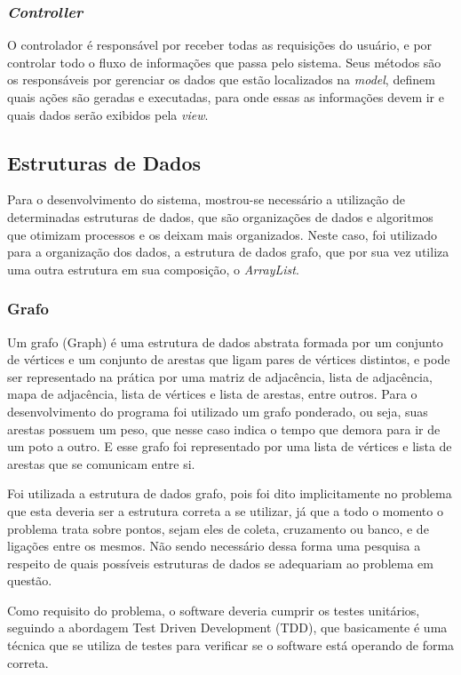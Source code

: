 \documentclass[12pt]{article}
\begin{document}
\subsubsection{\itshape{Controller}}
O controlador é responsável por receber todas as requisições do usuário, e por controlar todo o fluxo de informações que passa pelo sistema. Seus métodos são os responsáveis por gerenciar os dados que estão localizados na {\itshape model}, definem quais ações são geradas e executadas, para onde essas as informações devem ir e quais dados serão exibidos pela {\itshape view}.

\subsection{Estruturas de Dados}
Para o desenvolvimento do sistema, mostrou-se necessário a utilização de determinadas estruturas de dados, que são organizações de dados e algoritmos que otimizam processos e os deixam mais organizados. Neste caso, foi utilizado para a organização dos dados, a estrutura de dados grafo, que por sua vez utiliza uma outra estrutura em sua composição, o {\itshape ArrayList}.

\subsubsection{Grafo}
Um grafo (Graph) é uma estrutura de dados abstrata formada por um conjunto de vértices e um conjunto de arestas que ligam pares de vértices distintos, e pode ser representado na prática por uma matriz de adjacência, lista de adjacência, mapa de adjacência, lista de vértices e lista de arestas, entre outros. Para o desenvolvimento do programa foi utilizado um grafo ponderado, ou seja, suas arestas possuem um peso, que nesse caso indica o tempo que demora para ir de um poto a outro. E esse grafo foi representado por uma lista de vértices e lista de arestas que se comunicam entre si.

Foi utilizada a estrutura de dados grafo, pois foi dito implicitamente no problema que esta deveria ser a estrutura correta a se utilizar, já que a todo o momento o problema trata sobre pontos, sejam eles de coleta, cruzamento ou banco, e de ligações entre os mesmos. Não sendo necessário dessa forma uma pesquisa a respeito de quais possíveis estruturas de dados se adequariam ao problema em questão.

Como requisito do problema, o software deveria cumprir os testes unitários, seguindo a abordagem Test Driven Development (TDD), que basicamente é uma técnica que se utiliza de testes para verificar se o software está operando de forma correta.
\end{document}
